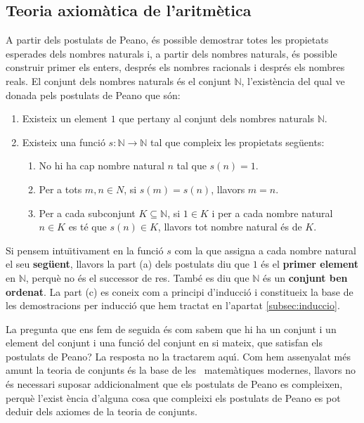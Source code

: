 \subsection{Teoria axiom\`{a}tica de l'aritm\`{e}tica}

A partir dels postulats de Peano, \'{e}s possible demostrar totes les
propietats esperades dels nombres naturals i, a partir dels nombres naturals,
\'{e}s possible construir primer els enters, despr\'{e}s els nombres
racionals i despr\'{e}s els nombres reals. El conjunt dels nombres naturals
\'{e}s el conjunt $\mathbb{N}$, l'exist\`{e}ncia del qual ve donada pels
postulats de Peano que s\'{o}n:

\begin{enumerate}
\item Existeix un element $1$ que pertany al conjunt dels nombres naturals $%
\mathbb{N}$.

\item Existeix una funci\'{o} $s:\mathbb{N}\longrightarrow\mathbb{N}$ tal
que compleix les propietats seg\"{u}ents:

\begin{enumerate}
\item No hi ha cap nombre natural $n$ tal que $s(n)=1.$

\item Per a tots $m,n\in N$, si $s(m)=s(n)$, llavors $m=n$.

\item Per a cada subconjunt $K\subseteq\mathbb{N}$, si $1\in K$ i per a cada
nombre natural $n\in K$ es t\'{e} que $s(n)\in K$, llavors tot nombre
natural \'{e}s de $K$.
\end{enumerate}
\end{enumerate}

Si pensem intu\"{\i}tivament en la funci\'{o} $s$ com la que assigna a cada
nombre natural el seu \textbf{seg\"{u}ent}, llavors la part (a) dels
postulats diu que $1$ \'{e}s el \textbf{primer element} en $\mathbb{N}$,
perqu\`{e} no \'{e}s el successor de res. Tamb\'{e} es diu que $\mathbb{N}$
\'{e}s un \textbf{conjunt ben ordenat}. La part (c) es coneix com a principi
d'inducci\'{o} i constitueix la base de les demostracions per inducci\'{o}
que hem tractat en l'apartat \ref{subsec:induccio}.

\bigskip

La pregunta que ens fem de seguida \'{e}s com sabem que hi ha un conjunt i
un element del conjunt i una funci\'{o} del conjunt en si mateix, que
satisfan els postulats de Peano? La resposta no la tractarem aqu\'{\i}. Com
hem assenyalat m\'{e}s amunt la teoria de conjunts \'{e}s la base de les \
matem\`{a}tiques modernes, llavors no \'{e}s necessari suposar
addicionalment que els postulats de Peano es compleixen, perqu\`{e} l'exist%
\`{e}ncia d'alguna cosa que compleixi els postulats de Peano es pot deduir
dels axiomes de la teoria de conjunts.

